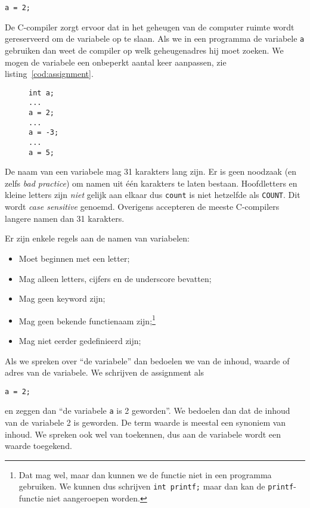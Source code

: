 \hspace*{1em}\texttt{a = 2;}

De C-compiler zorgt ervoor dat in het geheugen van de computer ruimte wordt gereserveerd om de variabele op te slaan. Als we in een programma de variabele \texttt{a} gebruiken dan weet de compiler op welk geheugenadres hij moet zoeken. We mogen de variabele een onbeperkt aantal keer aanpassen, zie listing~\ref{cod:assignment}.

\begin{figure}[!ht]
\begin{lstlisting}[caption=Meerdere toekenningen aan een variabele.,label=cod:assignment]
int a;
...
a = 2;
...
a = -3;
...
a = 5;
\end{lstlisting}
\end{figure}

De naam van een variabele mag 31 karakters lang zijn. Er is geen noodzaak (en zelfs \textsl{bad practice}) om namen uit één karakters te laten bestaan. Hoofdletters en kleine letters zijn \textsl{niet} gelijk aan elkaar dus \texttt{count} is niet hetzelfde als \texttt{COUNT}. Dit wordt \textsl{case sensitive} genoemd. Overigens accepteren de meeste  C-compilers langere namen dan 31 karakters.

Er zijn enkele regels aan de namen van variabelen:

\begin{itemize}
\item Moet beginnen met een letter;
\item Mag alleen letters, cijfers en de underscore bevatten;
\item Mag geen keyword zijn;
\item Mag geen bekende functienaam zijn;\footnote{Dat mag wel, maar dan kunnen we de functie niet in een programma gebruiken. We kunnen dus schrijven \texttt{int printf;} maar dan kan de \texttt{printf}-functie niet aangeroepen worden.}
\item Mag niet eerder gedefinieerd zijn;
\end{itemize}

\begin{infobox}
Als we spreken over ``de variabele'' dan bedoelen we van de inhoud, waarde of adres van de variabele. We schrijven de assignment als

\hspace*{1em}\texttt{a = 2;}

en zeggen dan ``de variabele \texttt{a} is 2 geworden''. We bedoelen dan dat de inhoud van de variabele 2 is geworden. De term waarde is meestal een synoniem van inhoud. We spreken ook wel van toekennen, dus aan de variabele wordt een waarde toegekend.
\end{infobox}

